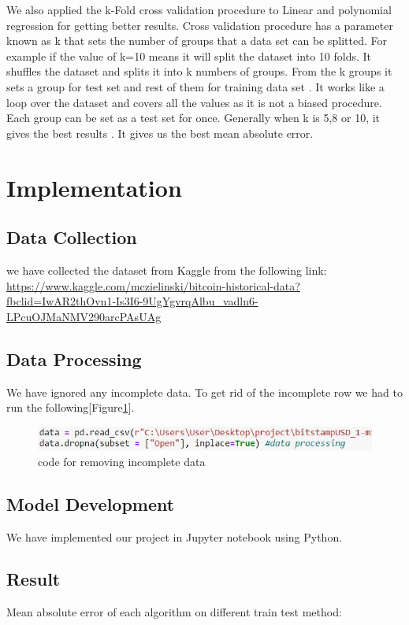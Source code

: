 \documentclass{IEEEtran}
\begin{document}
We also applied the k-Fold cross validation procedure to Linear and polynomial regression for getting better results. Cross validation procedure has a parameter known as k that sets the number of groups that a data set can be splitted. For example if the value of k=10 means it will split the dataset into 10 folds. It shuffles the dataset and splits it into k numbers of groups. From the k groups it sets a group for test set and rest of them for training data set	. It works like a loop over the dataset and covers all the values as it is not a biased procedure. Each group can be set as a test set for once. Generally when k is 5,8 or 10, it gives the best results \cite{Bb}. It gives us the best mean absolute error.

\section{Implementation}
\subsection{Data Collection}
we have collected the dataset from Kaggle from the following link: \url{https://www.kaggle.com/mczielinski/bitcoin-historical-data?fbclid=IwAR2thOvn1-Is3I6-9UgYgvrqAlbu_vadln6-LPcuOJMaNMV290arcPAsUAg}
\subsection{Data Processing}
We have ignored any incomplete data. To get rid of the incomplete row we had to run the following[Figure\ref{fig_incompleteData}].

\begin{figure}
\centering
\includegraphics[width = .5\textwidth,length = .7\textlength]{Capture.JPG}
\caption{code for removing incomplete data}
\label{fig_incompleteData}
\end{figure}
\subsection{Model Development}

We have implemented our project in Jupyter notebook using Python.
\subsection{Result}
Mean absolute error of each algorithm on different train test method: \\
\\
\end{document}
